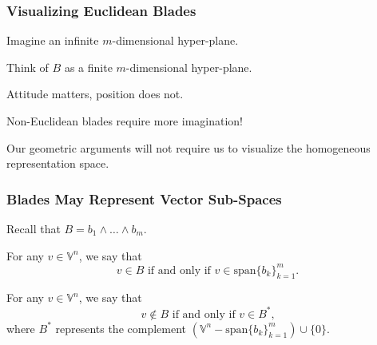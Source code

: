 \documentclass{beamer}
\newcommand{\V}{\mathbb{V}}
\begin{document}
\begin{frame}
\frametitle{Visualizing Euclidean Blades}
\pause
Imagine an \alert{infinite} $m$-dimensional hyper-plane.\pause

Think of $B$ as a \alert{finite} $m$-dimensional hyper-plane.\pause

\alert{Attitude} matters, \alert{position} does not.\pause

\alert{Non-Euclidean} blades require more imagination!\pause

Our geometric arguments will not require us to visualize the homogeneous representation space.
\end{frame}

\begin{frame}
\frametitle{Blades May Represent Vector Sub-Spaces}
\pause
Recall that $B = b_1\wedge\dots\wedge b_m$.\pause
\begin{definition}
For any $v\in\V^n$, we say that
\begin{equation*}
\mbox{$v\in B$ if and only if $v\in\mbox{span}\{b_k\}_{k=1}^m$}.
\end{equation*}
\end{definition}\pause
\begin{definition}
For any $v\in\V^n$, we say that
\begin{equation*}
\mbox{$v\not\in B$ if and only if $v\in B^*$,}
\end{equation*}
where $B^*$ represents the complement $(\V^n-\mbox{span}\{b_k\}_{k=1}^m)\cup\{0\}$.
\end{definition}
\end{frame}
\end{document}
